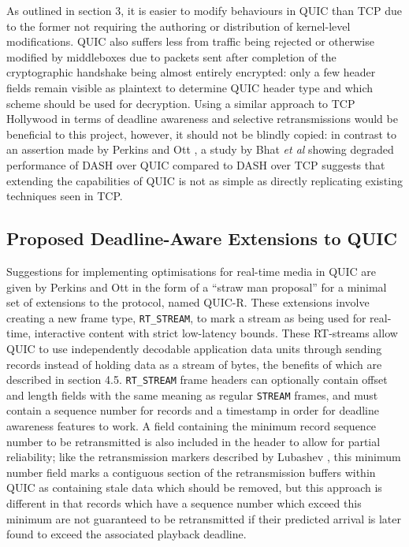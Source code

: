\documentclass{mprop}
\begin{document}
As outlined in section 3, it is easier to modify behaviours in QUIC than TCP due to the former not requiring the authoring or distribution of kernel-level modifications. QUIC also suffers less from traffic being rejected or otherwise modified by middleboxes due to packets sent after completion of the cryptographic handshake being almost entirely encrypted: only a few header fields remain visible as plaintext to determine QUIC header type and which scheme should be used for decryption. Using a similar approach to TCP Hollywood in terms of deadline awareness and selective retransmissions would be beneficial to this project, however, it should not be blindly copied: in contrast to an assertion made by Perkins and Ott \cite{Perkins2018}, a study by Bhat \textit{et al} \cite{Bhat2017} showing degraded performance of DASH over QUIC compared to DASH over TCP suggests that extending the capabilities of QUIC is not as simple as directly replicating existing techniques seen in TCP.

\subsection{Proposed Deadline-Aware Extensions to QUIC}

Suggestions for implementing optimisations for real-time media in QUIC are given by Perkins and Ott in the form of a ``straw man proposal'' for a minimal set of extensions to the protocol, named QUIC-R. These extensions involve creating a new frame type, \texttt{RT\_STREAM}, to mark a stream as being used for real-time, interactive content with strict low-latency bounds. These RT-streams allow QUIC to use independently decodable application data units through sending records instead of holding data as a stream of bytes, the benefits of which are described in section 4.5. \texttt{RT\_STREAM} frame headers can optionally contain offset and length fields with the same meaning as regular \texttt{STREAM} frames, and must contain a sequence number for records and a timestamp in order for deadline awareness features to work. A field containing the minimum record sequence number to be retransmitted is also included in the header to allow for partial reliability; like the retransmission markers described by Lubashev \cite{Lubashev2018}, this minimum number field marks a contiguous section of the retransmission buffers within QUIC as containing stale data which should be removed, but this approach is different in that records which have a sequence number which exceed this minimum are not guaranteed to be retransmitted if their predicted arrival is later found to exceed the associated playback deadline.
\end{document}
